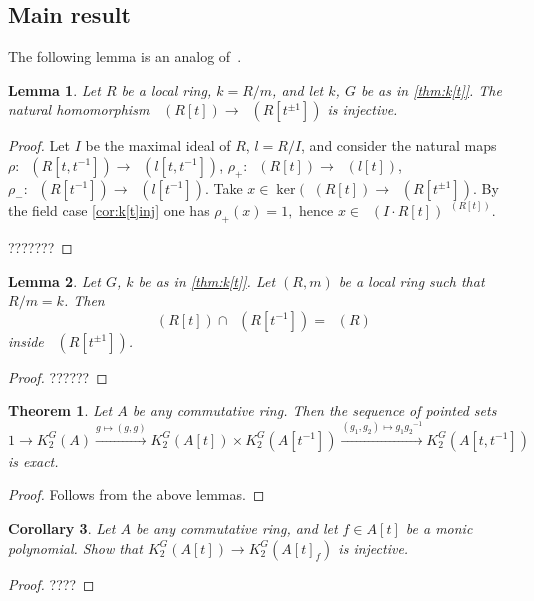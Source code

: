 \documentclass[oneside,12pt]{amsart}
\newtheorem{thm}{Theorem}
\numberwithin{equation}{section}
\newtheorem{lem}{Lemma}
\numberwithin{lem}{section}
\newtheorem{cor}[lem]{Corollary}
\theoremstyle{definition}
\theoremstyle{remark}
\DeclareMathOperator{\St}{St^G}
\newcommand{\st}{\scriptstyle}
\begin{document}
\subsection{Main result}

The following lemma is an analog of~\cite[Proposition 4.3 (a)]{Tu}.

\begin{lem}
Let $R$ be a local ring, $k=R/m$, and let $k$, $G$ be as in \cref{thm:k[t]}.
The natural homomorphism $\St(R[t])\to\St(R[t^{\pm 1}])$ is injective.
\end{lem}
\begin{proof}
Let $I$ be the maximal ideal of $R$,
$l=R/I$, and consider the natural maps $\rho:\St(R[t,t^{-1}])\to \St(l[t,t^{-1}])$,
$\rho_+:\St(R[t])\to \St(l[t])$, $\rho_-:\St(R[t^{-1}])\to\St(l[t^{-1}])$.
Take $x\in \ker(\St(R[t])\to\St(R[t^{\pm 1}])$.
By the field case \cref{cor:k[t]inj} one has
$\rho_+(x)=1,$ hence $x\in\St(I\cdot R[t])^{\St(R[t])}$.

???????
\end{proof}

\begin{lem}
Let $G$, $k$ be as in \cref{thm:k[t]}.
Let $(R,m)$ be a local ring such that $R/m=k$.
Then
$$\St(R[t])\cap \St(R[t^{-1}])=\St(R)$$
inside $\St(R[t^{\pm 1}])$.
\end{lem}
\begin{proof}
??????
\end{proof}

\begin{thm}
Let $A$ be any commutative ring. Then the sequence of pointed sets
$$1\longrightarrow K_2^G(A)\xrightarrow{\st g\mapsto (g,g)} K_2^G(A[t])\times K_2^G(A[t^{-1}])
\xrightarrow{\st (g_1,g_2)\mapsto g_1{g_2}^{-1}} K_2^G(A[t,t^{-1}])$$
is exact.
\end{thm}
\begin{proof}
Follows from the above lemmas.
\end{proof}

\begin{cor}
 Let $A$ be any commutative ring, and let $f\in A[t]$ be a monic polynomial. Show that
$K_2^G(A[t])\to K_2^G(A[t]_f)$ is injective.
\end{cor}
\begin{proof}
????
\end{proof}
\end{document}
